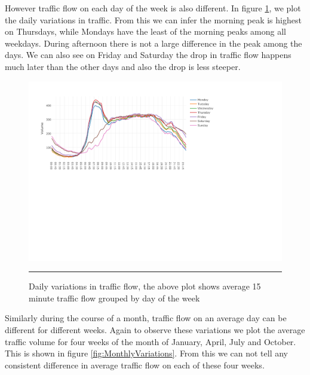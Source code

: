 However traffic flow on each day of the week is also different. In figure \ref{fig:TypicalDayTraffic},
we plot the daily variations in traffic. From this we can infer the morning peak is highest on
Thursdays, while Mondays have the least of the morning peaks among all weekdays. During afternoon
there is not a large difference in the peak among the days. We can also see on Friday and Saturday
the drop in traffic flow happens much later than the other days and also the drop is less steeper.

\begin{figure}[htbp]
    \centering
    \includegraphics[width=\textwidth]{Plots/average-group-day.pdf}
    \rule{35em}{0.5pt}
    \label{fig:averageGroupByDay}
  \caption[Average traffic flow grouped by day of the week]{Daily variations in traffic flow, the
   above plot shows average 15 minute traffic flow grouped by day of the week}
  \label{fig:TypicalDayTraffic}
\end{figure}


Similarly during the course of a month, traffic flow on an average day can be different for different
weeks. Again to observe these variations we plot the average traffic volume for four weeks
of the month of January, April, July and October. This is shown in figure
\ref{fig:MonthlyVariations}. From this we can not tell any consistent difference in average traffic
flow on each of these four weeks.

